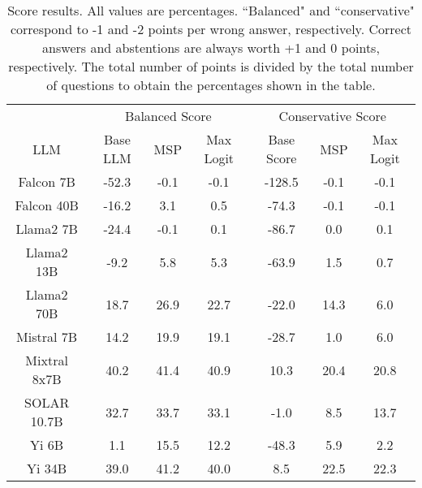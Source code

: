 \renewcommand\arraystretch{1.2}
\begin{table*}
\centering
\begin{tabular}{c|c|c|c|c|c|c}
& \multicolumn{3}{c|}{Balanced Score} & \multicolumn{3}{c}{Conservative Score} \\ 
LLM & Base LLM & MSP & Max Logit & Base Score & MSP & Max Logit\\ \hline
Falcon 7B & -52.3 & -0.1 & -0.1 & -128.5 & -0.1 & -0.1\\
Falcon 40B & -16.2 & 3.1 & 0.5 & -74.3 & -0.1 & -0.1\\
Llama2 7B & -24.4 & -0.1 & 0.1 & -86.7 & 0.0 & 0.1\\
Llama2 13B & -9.2 & 5.8 & 5.3 & -63.9 & 1.5 & 0.7\\
Llama2 70B & 18.7 & 26.9 & 22.7 & -22.0 & 14.3 & 6.0\\
Mistral 7B & 14.2 & 19.9 & 19.1 & -28.7 & 1.0 & 6.0\\
Mixtral 8x7B & 40.2 & 41.4 & 40.9 & 10.3 & 20.4 & 20.8\\
SOLAR 10.7B & 32.7 & 33.7 & 33.1 & -1.0 & 8.5 & 13.7\\
Yi 6B & 1.1 & 15.5 & 12.2 & -48.3 & 5.9 & 2.2\\
Yi 34B & 39.0 & 41.2 & 40.0 & 8.5 & 22.5 & 22.3\\
\hline
\end{tabular}
\caption{Score results. All values are percentages. ``Balanced" and ``conservative" correspond to -1 and -2 points per wrong answer, respectively. Correct answers and abstentions are always worth +1 and 0 points, respectively. The total number of points is divided by the total number of questions to obtain the percentages shown in the table.}
\label{tab:score}
\end{table*}
